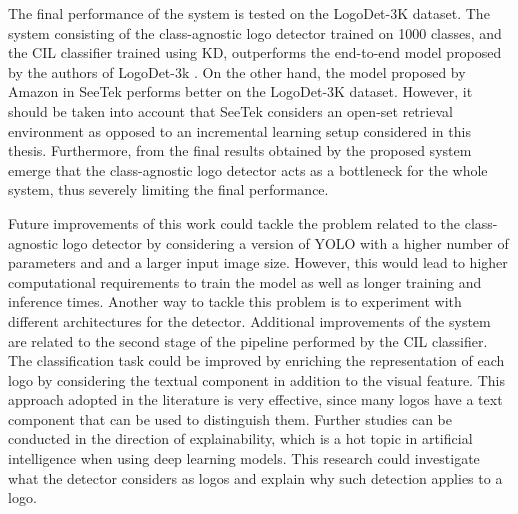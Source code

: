 The final performance of the system is tested on the LogoDet-3K dataset.
The system consisting of the class-agnostic logo detector trained on 1000 classes, and the CIL classifier trained using KD, outperforms the end-to-end model proposed by the authors of LogoDet-3k \cite{wang2022logodet}.
On the other hand, the model proposed by Amazon in SeeTek \cite{li2022seetek} performs better on the LogoDet-3K dataset. However, it should be taken into account that SeeTek considers an open-set retrieval environment as opposed to an incremental learning setup considered in this thesis.
Furthermore, from the final results obtained by the proposed system emerge that the class-agnostic logo detector acts as a bottleneck for the whole system, thus severely limiting the final performance.

Future improvements of this work could tackle the problem related to the class-agnostic logo detector by considering a version of YOLO with a higher number of parameters and and a larger input image size.
However, this would lead to higher computational requirements to train the model as well as longer training and inference times.
Another way to tackle this problem is to experiment with different architectures for the detector.
Additional improvements of the system are related to the second stage of the pipeline performed by the CIL classifier.
The classification task could be improved by enriching the representation of each logo by considering the textual component in addition to the visual feature.
This approach adopted in the literature is very effective, since many logos have a text component that can be used to distinguish them.
Further studies can be conducted in the direction of explainability, which is a hot topic in artificial intelligence when using deep learning models. This research could investigate what the detector considers as logos and explain why such detection applies to a logo.
